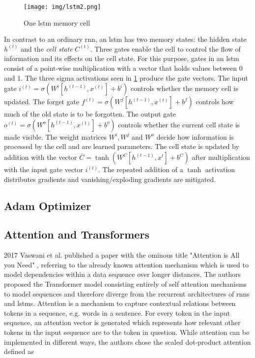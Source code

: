 \begin{figure}[h]
	\centering
	\texttt{[image: img/lstm2.png]}
	\caption{One \gls{lstm} memory cell \cite{rnn_zachary}}
	\label{fig:background:lstm}
\end{figure}
In contrast to an ordinary \gls{rnn}, an \gls{lstm} has two memory states: the hidden state $h^{(t)}$ and the \textit{cell state} $C^{(t)}$. Three gates enable the cell to control the flow of information and its effects on the cell state. For this purpose, gates in an \gls{lstm} consist of a point-wise multiplication with a vector that holds values between 0 and 1. The three sigma activations seen in \ref{fig:background:lstm} produce the gate vectors. The input gate $i^{(t)} = \sigma(W^i[h^{(t-1)},x^{(t)}] + b^i)$ controls whether the memory cell is updated. The forget gate $f^{(t)} = \sigma(W^f[h^{(t-1)},x^{(t)}] + b^f)$ controls how much of the old state is to be forgotten. The output gate $o^{(t)} = \sigma(W^o[h^{(t-1)},x^{(t)}] + b^o)$ controls whether the current cell state is made visible. The weight matrices $W^i, W^j$ and $W^o$ decide how information is processed by the cell and are learned parameters. The cell state is updated by addition with the vector $\bar{C}=\tanh(W^C[h^{(t-1)},x^{t}]+b^C)$ after multiplication with the input gate vector $i^{(t)}$. The repeated addition of a $\tanh$ activation distributes gradients and vanishing/exploding gradients are mitigated.

\subsection{Adam Optimizer}

\subsection{Attention and Transformers}

2017 Vaswani et al. published a paper with the ominous title "Attention is All you Need" \cite{attention_origin}, referring to the already known attention mechanism which is used to model dependencies within a data sequence over longer distances. The authors proposed the Transformer model consisting entirely of self attention mechanisms to model sequences and therefore diverge from the recurrent architectures of \glspl{rnn} and \glspl{lstm}. Attention is a mechanism to capture contextual relations between tokens in a sequence, e.g. words in a sentence. For every token in the input sequence, an attention vector is generated which represents how relevant other tokens in the input sequence are to the token in question. While attention can be implemented in different ways, the authors chose the scaled dot-product attention defined as 

